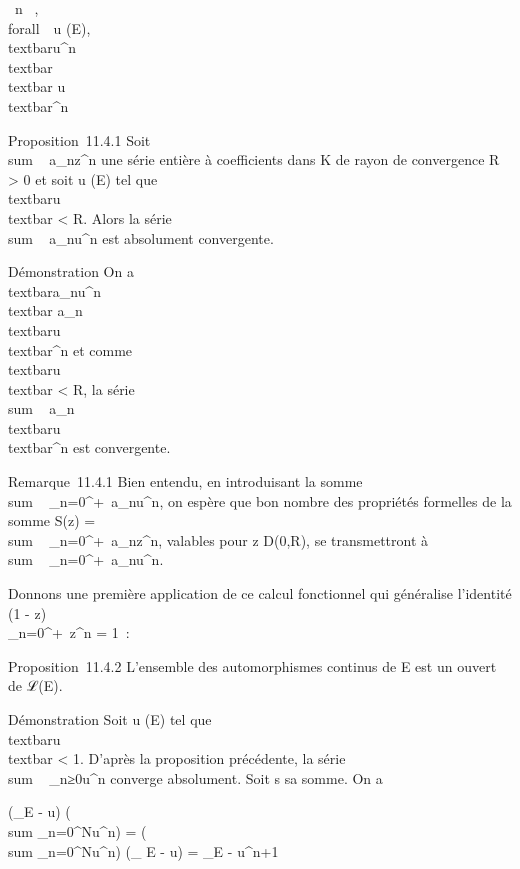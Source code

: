 \documentclass[]{article}
\begin{document}
\forall~n \in {}~, \\forall~~u (E),
\\textbar{}u^n\\textbar{}
\leq\\textbar{} u\\textbar{}^n

Proposition~11.4.1 Soit
\\sum ~
a\_nz^n une série entière à coefficients dans K de
rayon de convergence R \textgreater{} 0 et soit u (E) tel que
\\textbar{}u\\textbar{} \textless{} R.
Alors la série \\sum ~
a\_nu^n est absolument convergente.

Démonstration On a
\\textbar{}a\_nu^n\\textbar{}
\leq\textbar{}a\_n\textbar{}\,\\textbar{}u\\textbar{}^n
et comme \\textbar{}u\\textbar{}
\textless{} R, la série
\\sum ~
\textbar{}a\_n\textbar{}\,\\textbar{}u\\textbar{}^n
est convergente.

Remarque~11.4.1 Bien entendu, en introduisant la somme
\\sum ~
\_n=0^+\infty~a\_nu^n, on espère que bon
nombre des propriétés formelles de la somme S(z)
= \\sum ~
\_n=0^+\infty~a\_nz^n, valables pour z \in
D(0,R), se transmettront à
\\sum ~
\_n=0^+\infty~a\_nu^n.

Donnons une première application de ce calcul fonctionnel qui généralise
l'identité (1 - z)\\\sum
 \_n=0^+\infty~z^n = 1~:

Proposition~11.4.2 L'ensemble des automorphismes continus de E est un
ouvert de ℒ(E).

Démonstration Soit u (E) tel que
\\textbar{}u\\textbar{} \textless{} 1.
D'après la proposition précédente, la série
\\sum ~
\_n≥0u^n converge absolument. Soit s sa somme. On a

(\mathrmId\_E - u) \cdot\left
(\\sum
\_n=0^Nu^n\right ) =
\left (\\sum
\_n=0^Nu^n\right ) \cdot
(\mathrmId\_ E - u) =
\mathrmId\_E - u^n+1
\end{document}
